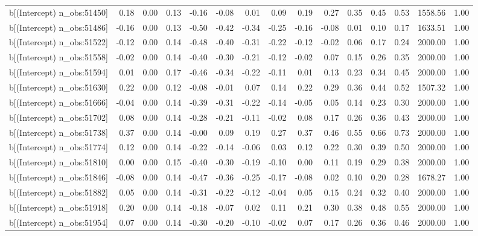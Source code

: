 \begin{table}[ht]
\begin{tabular}{rrrrrrrrrrrrrrr}
  b[(Intercept) n\_obs:51450] & 0.18 & 0.00 & 0.13 & -0.16 & -0.08 & 0.01 & 0.09 & 0.19 & 0.27 & 0.35 & 0.45 & 0.53 & 1558.56 & 1.00 \\ 
  b[(Intercept) n\_obs:51486] & -0.16 & 0.00 & 0.13 & -0.50 & -0.42 & -0.34 & -0.25 & -0.16 & -0.08 & 0.01 & 0.10 & 0.17 & 1633.51 & 1.00 \\ 
  b[(Intercept) n\_obs:51522] & -0.12 & 0.00 & 0.14 & -0.48 & -0.40 & -0.31 & -0.22 & -0.12 & -0.02 & 0.06 & 0.17 & 0.24 & 2000.00 & 1.00 \\ 
  b[(Intercept) n\_obs:51558] & -0.02 & 0.00 & 0.14 & -0.40 & -0.30 & -0.21 & -0.12 & -0.02 & 0.07 & 0.15 & 0.26 & 0.35 & 2000.00 & 1.00 \\ 
  b[(Intercept) n\_obs:51594] & 0.01 & 0.00 & 0.17 & -0.46 & -0.34 & -0.22 & -0.11 & 0.01 & 0.13 & 0.23 & 0.34 & 0.45 & 2000.00 & 1.00 \\ 
  b[(Intercept) n\_obs:51630] & 0.22 & 0.00 & 0.12 & -0.08 & -0.01 & 0.07 & 0.14 & 0.22 & 0.29 & 0.36 & 0.44 & 0.52 & 1507.32 & 1.00 \\ 
  b[(Intercept) n\_obs:51666] & -0.04 & 0.00 & 0.14 & -0.39 & -0.31 & -0.22 & -0.14 & -0.05 & 0.05 & 0.14 & 0.23 & 0.30 & 2000.00 & 1.00 \\ 
  b[(Intercept) n\_obs:51702] & 0.08 & 0.00 & 0.14 & -0.28 & -0.21 & -0.11 & -0.02 & 0.08 & 0.17 & 0.26 & 0.36 & 0.43 & 2000.00 & 1.00 \\ 
  b[(Intercept) n\_obs:51738] & 0.37 & 0.00 & 0.14 & -0.00 & 0.09 & 0.19 & 0.27 & 0.37 & 0.46 & 0.55 & 0.66 & 0.73 & 2000.00 & 1.00 \\ 
  b[(Intercept) n\_obs:51774] & 0.12 & 0.00 & 0.14 & -0.22 & -0.14 & -0.06 & 0.03 & 0.12 & 0.22 & 0.30 & 0.39 & 0.50 & 2000.00 & 1.00 \\ 
  b[(Intercept) n\_obs:51810] & 0.00 & 0.00 & 0.15 & -0.40 & -0.30 & -0.19 & -0.10 & 0.00 & 0.11 & 0.19 & 0.29 & 0.38 & 2000.00 & 1.00 \\ 
  b[(Intercept) n\_obs:51846] & -0.08 & 0.00 & 0.14 & -0.47 & -0.36 & -0.25 & -0.17 & -0.08 & 0.02 & 0.10 & 0.20 & 0.28 & 1678.27 & 1.00 \\ 
  b[(Intercept) n\_obs:51882] & 0.05 & 0.00 & 0.14 & -0.31 & -0.22 & -0.12 & -0.04 & 0.05 & 0.15 & 0.24 & 0.32 & 0.40 & 2000.00 & 1.00 \\ 
  b[(Intercept) n\_obs:51918] & 0.20 & 0.00 & 0.14 & -0.18 & -0.07 & 0.02 & 0.11 & 0.21 & 0.30 & 0.38 & 0.48 & 0.55 & 2000.00 & 1.00 \\ 
  b[(Intercept) n\_obs:51954] & 0.07 & 0.00 & 0.14 & -0.30 & -0.20 & -0.10 & -0.02 & 0.07 & 0.17 & 0.26 & 0.36 & 0.46 & 2000.00 & 1.00 \\ 

\end{tabular}
\end{table}
